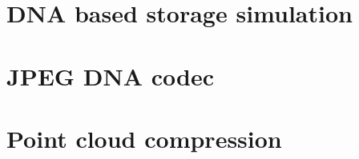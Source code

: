 
\section{DNA based storage simulation}


\section{JPEG DNA codec}


\section{Point cloud compression}

